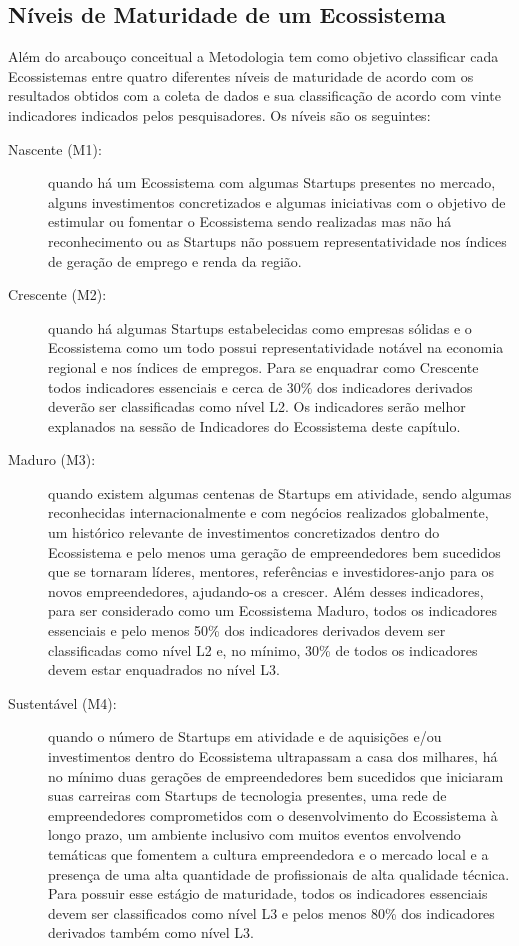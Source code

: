 \subsection{Níveis de Maturidade de um Ecossistema}
\label{subsection:niveis_de_maturidade_de_um_ecossistema}

Além do arcabouço conceitual a Metodologia tem como objetivo classificar cada Ecossistemas entre quatro diferentes níveis de maturidade de acordo com os resultados obtidos com a coleta de dados e sua classificação de acordo com vinte indicadores indicados pelos pesquisadores. Os níveis são os seguintes:

\begin{description}
  \item [Nascente (M1):] quando há um Ecossistema com algumas Startups presentes no mercado, alguns investimentos concretizados e algumas iniciativas com o objetivo de estimular ou fomentar o Ecossistema sendo realizadas mas não há reconhecimento ou as Startups não possuem representatividade nos índices de geração de emprego e renda da região.

  \item [Crescente (M2):] quando há algumas Startups estabelecidas como empresas sólidas e o Ecossistema como um todo possui representatividade notável na economia regional e nos índices de empregos. Para se enquadrar como Crescente todos indicadores essenciais e cerca de 30\% dos indicadores derivados deverão ser classificadas como nível L2. Os indicadores serão melhor explanados na sessão de Indicadores do Ecossistema deste capítulo.

  \item [Maduro (M3):] quando existem algumas centenas de Startups em atividade, sendo algumas reconhecidas internacionalmente e com negócios realizados globalmente, um histórico relevante de investimentos concretizados dentro do Ecossistema e pelo menos uma geração de empreendedores bem sucedidos que se tornaram líderes, mentores, referências e investidores-anjo para os novos empreendedores, ajudando-os a crescer. Além desses indicadores, para ser considerado como um Ecossistema Maduro, todos os indicadores essenciais e pelo menos 50\% dos indicadores derivados devem ser classificadas como nível L2 e, no mínimo, 30\% de todos os indicadores devem estar enquadrados no nível L3.

  \item [Sustentável (M4):] quando o número de Startups em atividade e de aquisições e/ou investimentos dentro do Ecossistema ultrapassam a casa dos milhares, há no mínimo duas gerações de empreendedores bem sucedidos que iniciaram suas carreiras com Startups de tecnologia presentes, uma rede de empreendedores comprometidos com o desenvolvimento do Ecossistema à longo prazo, um ambiente inclusivo com muitos eventos envolvendo temáticas que fomentem a cultura empreendedora e o mercado local e a presença de uma alta quantidade de profissionais de alta qualidade técnica. Para possuir esse estágio de maturidade, todos os indicadores essenciais devem ser classificados como nível L3 e pelos menos 80\% dos indicadores derivados também como nível L3.
\end{description}

